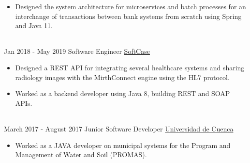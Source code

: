 \documentclass[letterpaper]{twentysecondcv} %
\begin{document}
\begin{twentyla}
{        \begin{itemize}
            \item Designed the system architecture for microservices and batch processes for an interchange of transactions between bank systems from scratch using Spring and Java 11.
         \end{itemize}
    }
    \\

\twentyitem
    {Jan 2018 -}
    {May 2019}
    {Software Engineer}
    {\href{http://www.softcase.com.ec/}{SoftCase}}
    {}
    {
        \begin{itemize}
            \item Designed a REST API for integrating several healthcare systems and sharing radiology images with the MirthConnect engine using the HL7 protocol.
         \end{itemize}

        \begin{itemize}
            \item Worked as a backend developer using Java 8, building REST and SOAP APIs.
          \end{itemize}
    }
    \\

\twentyitem
    {March 2017 -}
    {August 2017}
    {Junior Software Developer}
    {\href{http://www.ucuenca.edu.ec/}{Universidad de Cuenca}}
    {}
    {
        \begin{itemize}
            \item Worked as a JAVA developer on municipal systems for the Program and Management of Water and Soil (PROMAS).
        \end{itemize}
    }
    \\

\end{twentyla}
\end{document}
